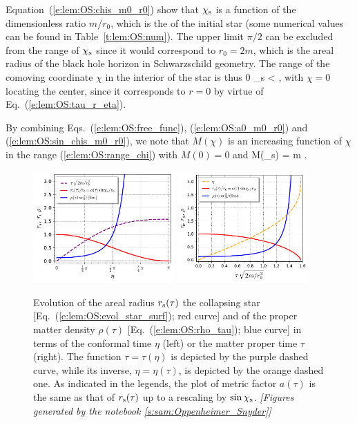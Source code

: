 Equation~(\ref{e:lem:OS:chis_m0_r0}) show that
$\chi_{\rm s}$ is a function of the dimensionless ratio $m/r_0$, which is the
 of the initial star
(some numerical values can be found in Table~\ref{t:lem:OS:num}).
The upper limit $\pi/2$ can be excluded from the range of
$\chi_{\rm s}$ since it
would correspond to $r_0 = 2 m$, which is the areal radius of the black hole
horizon in Schwarzschild geometry. The range of the comoving coordinate $\chi$
in the interior of the star is thus
\be \label{e:lem:OS:range_chi}
    0 \leq \chi \leq \chi_{\rm s} <  ,
\ee
with $\chi=0$ locating the center, since it corresponds to $r=0$ by
virtue of Eq.~(\ref{e:lem:OS:tau_r_eta}).

By combining Eqs.~(\ref{e:lem:OS:free_func}), (\ref{e:lem:OS:a0_m0_r0}) and
(\ref{e:lem:OS:sin_chis_m0_r0}), we note that $M(\chi)$ is an increasing function
of $\chi$ in the range (\ref{e:lem:OS:range_chi}) with $M(0) = 0$ and
\be
    M(\chi_{\rm s}) = m .
\ee


\begin{figure}
\centerline{
\includegraphics[width=0.48\textwidth]{lem_OS_rs_rho_eta.pdf}\quad
\includegraphics[width=0.45\textwidth]{lem_OS_rs_rho_tau.pdf}
}
\caption[]{\label{f:lem:OS:rs_tho} \footnotesize
Evolution of the areal radius $r_{\rm s}(\tau)$ the collapsing star [Eq.~(\ref{e:lem:OS:evol_star_surf}); red curve] and of the proper matter density
$\rho(\tau)$ [Eq.~(\ref{e:lem:OS:rho_tau}); blue curve] in terms of the conformal time $\eta$ (left)
or the matter proper time $\tau$ (right).  The function $\tau = \tau(\eta)$ is depicted by the purple dashed curve, while its inverse, $\eta = \eta(\tau)$, is depicted by the orange dashed one.
As indicated in the legends, the plot of metric
factor $a(\tau)$ is the same as that of $r_{\rm s}(\tau)$ up to a rescaling
by $\sin\chi_{\rm s}$.
\textsl{[Figures generated by the notebook \ref{s:sam:Oppenheimer_Snyder}]}
}
\end{figure}


